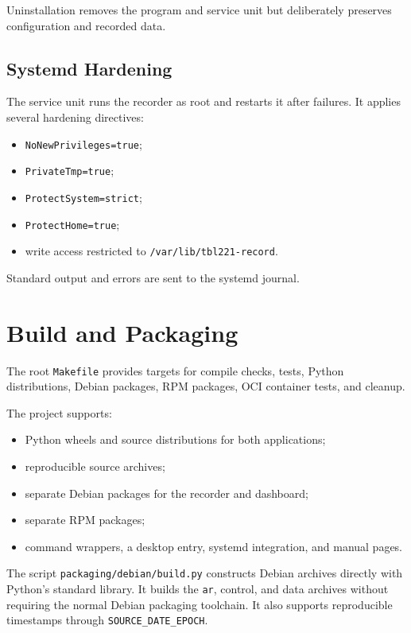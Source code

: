 \documentclass[11pt,a4paper]{article}
\begin{document}
Uninstallation removes the program and service unit but deliberately preserves configuration and recorded data.

\subsection{Systemd Hardening}

The service unit runs the recorder as root and restarts it after failures. It applies several hardening directives:

\begin{itemize}
  \item \texttt{NoNewPrivileges=true};
  \item \texttt{PrivateTmp=true};
  \item \texttt{ProtectSystem=strict};
  \item \texttt{ProtectHome=true};
  \item write access restricted to \texttt{/var/lib/tbl221-record}.
\end{itemize}

Standard output and errors are sent to the systemd journal.

\section{Build and Packaging}

The root \texttt{Makefile} provides targets for compile checks, tests, Python distributions, Debian packages, RPM packages, OCI container tests, and cleanup.

The project supports:

\begin{itemize}
  \item Python wheels and source distributions for both applications;
  \item reproducible source archives;
  \item separate Debian packages for the recorder and dashboard;
  \item separate RPM packages;
  \item command wrappers, a desktop entry, systemd integration, and manual pages.
\end{itemize}

The script \texttt{packaging/debian/build.py} constructs Debian archives directly with Python's standard library. It builds the \texttt{ar}, control, and data archives without requiring the normal Debian packaging toolchain. It also supports reproducible timestamps through \texttt{SOURCE\_DATE\_EPOCH}.
\end{document}
